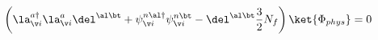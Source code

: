 \begin{equation}
 \left(\la^{a \dag}_{\v i}\la^{a}_{\v i}\del^{\al\bt}+
\psi^{n\al \dag}_{\v i}\psi^{n\bt}_{\v i} -\del^{\al\bt}\frac{3}{2}N_f
\right)
\ket{\Phi_{phys}} =0
\end{equation}

